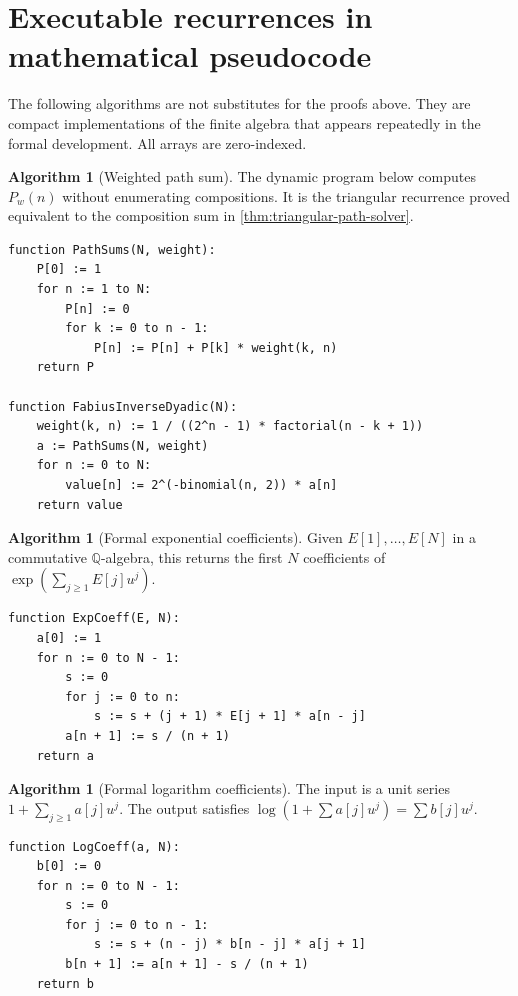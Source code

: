 \documentclass[11pt,oneside]{article}
\theoremstyle{definition}
\newtheorem{algorithm}[theorem]{Algorithm}
\theoremstyle{remark}
\newcommand{\Q}{\mathbb Q}
\begin{document}
\appendix

\section{Executable recurrences in mathematical pseudocode}
\label{app:algorithms}

The following algorithms are not substitutes for the proofs above.  They are compact
implementations of the finite algebra that appears repeatedly in the formal development.
All arrays are zero-indexed.

\begin{algorithm}[Weighted path sum]
\label{alg:path-sum}
The dynamic program below computes $P_w(n)$ without enumerating compositions.  It is the
triangular recurrence proved equivalent to the composition sum in
\cref{thm:triangular-path-solver}.
\end{algorithm}
\begin{lstlisting}[style=pseudo]
function PathSums(N, weight):
    P[0] := 1
    for n := 1 to N:
        P[n] := 0
        for k := 0 to n - 1:
            P[n] := P[n] + P[k] * weight(k, n)
    return P

function FabiusInverseDyadic(N):
    weight(k, n) := 1 / ((2^n - 1) * factorial(n - k + 1))
    a := PathSums(N, weight)
    for n := 0 to N:
        value[n] := 2^(-binomial(n, 2)) * a[n]
    return value
\end{lstlisting}

\begin{algorithm}[Formal exponential coefficients]
\label{alg:expcoeff}
Given $E[1],\ldots,E[N]$ in a commutative $\Q$-algebra, this returns the first $N$
coefficients of $\exp(\sum_{j\ge1}E[j]u^j)$.
\end{algorithm}
\begin{lstlisting}[style=pseudo]
function ExpCoeff(E, N):
    a[0] := 1
    for n := 0 to N - 1:
        s := 0
        for j := 0 to n:
            s := s + (j + 1) * E[j + 1] * a[n - j]
        a[n + 1] := s / (n + 1)
    return a
\end{lstlisting}

\begin{algorithm}[Formal logarithm coefficients]
\label{alg:logcoeff}
The input is a unit series $1+\sum_{j\ge1}a[j]u^j$.  The output satisfies
$\log(1+\sum a[j]u^j)=\sum b[j]u^j$.
\end{algorithm}
\begin{lstlisting}[style=pseudo]
function LogCoeff(a, N):
    b[0] := 0
    for n := 0 to N - 1:
        s := 0
        for j := 0 to n - 1:
            s := s + (n - j) * b[n - j] * a[j + 1]
        b[n + 1] := a[n + 1] - s / (n + 1)
    return b
\end{lstlisting}
\end{document}
